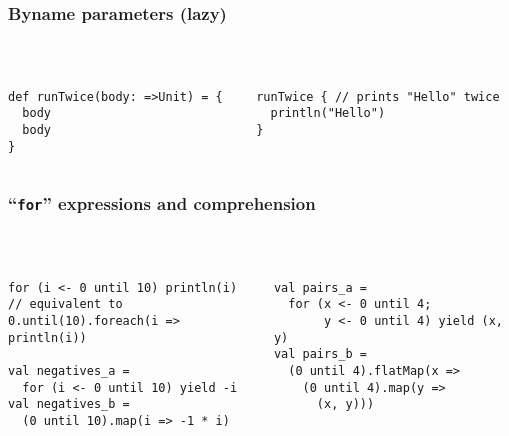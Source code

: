 \documentclass[aspectratio=169]{beamer}
\begin{document}
\begin{frame}[fragile]\frametitle{Byname parameters (lazy)}
~\\[-8mm]
\begin{columns}
\begin{column}{0.49\textwidth}
\begin{lstlisting}
def runTwice(body: =>Unit) = {
  body
  body
}
\end{lstlisting}
\end{column}
\begin{column}{0.49\textwidth}
\begin{lstlisting}
runTwice { // prints "Hello" twice
  println("Hello")
}
\end{lstlisting}%
\end{column}
\end{columns}
\end{frame}


\begin{frame}[fragile]\frametitle{``\texttt{for}'' expressions and comprehension}
~\\[-8mm]
\begin{columns}
\begin{column}{0.50\textwidth}
\begin{lstlisting}[emph={foreach,map,flatMap}]
for (i <- 0 until 10) println(i)
// equivalent to
0.until(10).foreach(i => println(i))

val negatives_a =
  for (i <- 0 until 10) yield -i
val negatives_b =
  (0 until 10).map(i => -1 * i)
\end{lstlisting}
\end{column}
\begin{column}{0.48\textwidth}
\pause
\begin{lstlisting}[emph={foreach,map,flatMap}]
val pairs_a =
  for (x <- 0 until 4;
       y <- 0 until 4) yield (x, y)
val pairs_b =
  (0 until 4).flatMap(x =>
    (0 until 4).map(y =>
      (x, y)))
\end{lstlisting}
\end{column}
\end{columns}
\end{frame}
\end{document}
